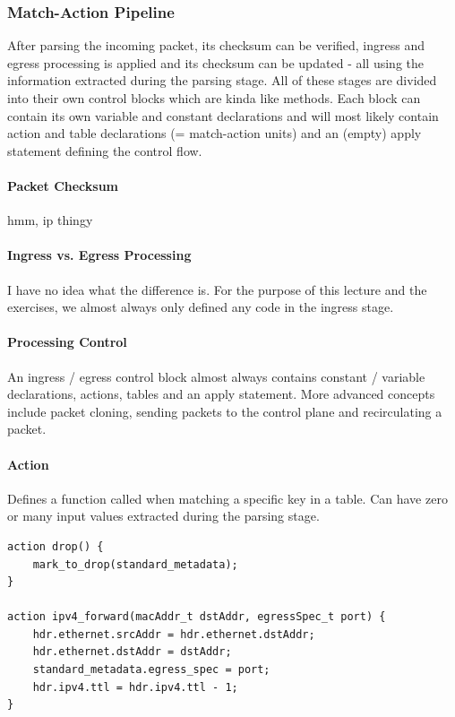 \subsubsection{Match-Action Pipeline}

After parsing the incoming packet, its checksum can be verified, ingress and egress processing is applied and its checksum can be updated - all using the information extracted during the parsing stage. All of these stages are divided into their own control blocks which are kinda like methods. Each block can contain its own variable and constant declarations and will most likely contain action and table declarations (= match-action units) and an (empty) apply statement defining the control flow.

\paragraph{Packet Checksum}
hmm, ip thingy %

\paragraph{Ingress vs. Egress Processing}
I have no idea what the difference is. For the purpose of this lecture and the exercises, we almost always only defined any code in the ingress stage. %

\paragraph{Processing Control}
An ingress / egress control block almost always contains constant / variable declarations, actions, tables and an apply statement. More advanced concepts include packet cloning, sending packets to the control plane and recirculating a packet.

\paragraph{Action}
Defines a function called when matching a specific key in a table. Can have zero or many input values extracted during the parsing stage.


\begin{lstlisting}
action drop() {
    mark_to_drop(standard_metadata);
}

action ipv4_forward(macAddr_t dstAddr, egressSpec_t port) {
    hdr.ethernet.srcAddr = hdr.ethernet.dstAddr;
    hdr.ethernet.dstAddr = dstAddr;
    standard_metadata.egress_spec = port;
    hdr.ipv4.ttl = hdr.ipv4.ttl - 1;
}
\end{lstlisting}

